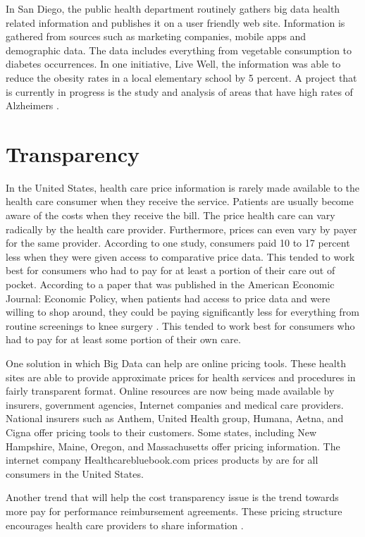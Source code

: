 \documentclass[sigconf]{acmart}
\begin{document}
{In San Diego, the public health department routinely gathers big data health related information and publishes it on a user friendly web site. Information is gathered from sources such as marketing companies, mobile apps and demographic data.  The data includes everything from vegetable consumption to diabetes occurrences.  In one initiative, Live Well, the information was able to reduce the obesity rates in a local elementary school by 5 percent. A project that is currently in progress is the study and analysis of areas that have high rates of Alzheimers \cite{www-google-sandiego}. 


\section{Transparency}
In the United States, health care price information is rarely made available to the health care consumer when they receive the service. Patients are usually become aware of the costs when they receive the bill. The price health care can vary radically by the health care provider. Furthermore, prices can even vary by payer for the same provider.  According to one study, consumers paid 10 to 17 percent less when they were given access to comparative price data.  This tended to work best for consumers who had to pay for at least a portion of their care out of pocket. According to a paper that was published in the American Economic Journal: Economic Policy, when patients had access to price data and were willing to shop around, they could be paying significantly less for everything from routine screenings to knee surgery \cite{www-google-transparent}.  This tended to work best for consumers who had to pay for at least some portion of their own care. 

One solution in which Big Data can help are online pricing tools. These health sites are able to provide approximate prices for health services and procedures in fairly transparent format. Online resources are now being made available by insurers, government agencies, Internet companies and medical care providers. National insurers such as Anthem, United Health group, Humana, Aetna, and Cigna offer pricing tools to their customers. Some states, including New Hampshire, Maine, Oregon, and Massachusetts offer pricing information. The internet company Healthcarebluebook.com prices products by are for all consumers in the United States. 

Another trend that will help the cost transparency issue is the trend towards more pay for performance reimbursement agreements. These pricing structure encourages health care providers to share information \cite{www-google-christian}. 

}
\end{document}
